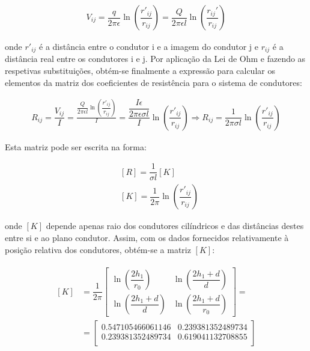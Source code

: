 \documentclass[11pt, a4paper, titlepage, portuguese]{article}
\begin{document}
	\begin{align*}
		V_{ij} = \dfrac{q}{2\pi\epsilon} \ln\left(\dfrac{r'_{ij} }{r_{ij} }\right) = \dfrac{Q}{2\pi\epsilon l} \ln\left(\dfrac{r_{ij} '}{r_{ij} }\right)
	\end{align*}

	\par
	onde $r'_{ij}$ é a distância entre o condutor i e a imagem do condutor j e $r_{ij}$ é a distância real entre os condutores i e j. Por aplicação da Lei de Ohm e fazendo as respetivas substituições, obtém-se finalmente a expressão para calcular os elementos da matriz dos coeficientes de resistência para o sistema de condutores:

	\begin{align*}
		R_{ij} = \dfrac{V_{ij} }{I} = \frac{\dfrac{Q}{2\pi\epsilon l} \ln\left(\dfrac{r'_{ij} }{r_{ij} }\right)}{I}
		= \dfrac{\dfrac{I \epsilon}{2\pi\epsilon \sigma l}}{I} \ln\left(\dfrac{r'_{ij} }{r_{ij} }\right)
		\Rightarrow R_{ij} = \dfrac{1}{2\pi\sigma l}\ln\left(\dfrac{r'_{ij} }{r_{ij} }\right)
	\end{align*}

	\par
	Esta matriz pode ser escrita na forma:

	\begin{align*}
		&[R] = \dfrac{1}{\sigma l} [K]  \\
		&[K] = \dfrac{1}{2 \pi} \ln\left(\dfrac{r'_{ij} }{r_{ij} }\right)
	\end{align*}

	\par
	onde $[K]$ depende apenas raio dos condutores cilíndricos e das distâncias destes entre si e ao plano condutor. Assim, com os dados fornecidos relativamente à posição relativa dos condutores, obtém-se a matriz $[K]$:

	\begin{align*}
		\begin{split}
		[K] &= \dfrac{1}{2\pi}
		\begin{bmatrix}
			\ln\left(\dfrac{2h_1}{r_0}\right) & \ln\left(\dfrac{2h_1 + d}{d}\right)  \\[1em]
			\ln\left(\dfrac{2h_1 + d}{d}\right) & \ln\left(\dfrac{2h_1 + d}{r_0}\right)
		\end{bmatrix} = \\
		&= \begin{bmatrix}
			0.547105466061146 & 0.239381352489734 \\
			0.239381352489734 & 0.619041132708855 \\
		\end{bmatrix}
		\end{split}
		\end{align*}
\end{document}
